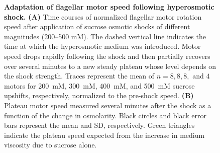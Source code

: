 \documentclass[twocolumn]{biophys-new}%
\begin{document}
 \begin{figure}
    \centering
    \caption{\textbf{Adaptation of flagellar motor speed following hyperosmotic shock.} 
    \textbf{(A)} Time courses of normalized flagellar motor rotation speed after application of sucrose osmotic shocks of different magnitudes (200--500 mM). The dashed vertical line indicates the time at which the hyperosmotic medium was introduced. Motor speed drops rapidly following the shock and then partially recovers over several minutes to a new steady plateau whose level depends on the shock strength. Traces represent the mean of $n = 8, 8, 8,$ and $4$ motors for 200~mM, 300~mM, 400~mM, and 500~mM sucrose upshifts, respectively, normalized to the pre-shock speed.
    \textbf{(B)} Plateau motor speed measured several minutes after the shock as a function of the change in osmolarity. Black circles and black error bars represent the mean and SD, respectively. Green triangles indicate the plateau speed expected from the increase in medium viscosity due to sucrose alone.}
    \label{fig:osmoadaption}
\end{figure}
\end{document}
